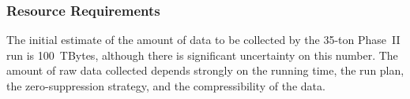 

\subsubsection{Resource Requirements}

The initial estimate of the amount of data to be collected by the 35-ton Phase~II run is 100~TBytes,
although there is significant uncertainty on this number.  The amount of raw data collected
depends strongly on the running time, the run plan, the zero-suppression strategy, and the
compressibility of the data.
